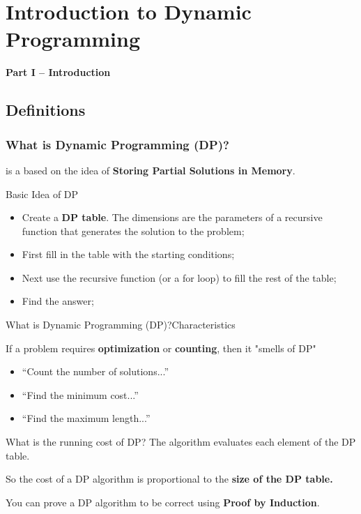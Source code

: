 \section{Introduction to Dynamic Programming}

\begin{frame}
  \begin{center}
    {\bf Part I -- Introduction}
  \end{center}
\end{frame}

\subsection{Definitions}
\begin{frame}
  \frametitle{What is Dynamic Programming (DP)?}

   is a  based on the idea of {\bf Storing Partial Solutions in Memory}.

  \bigskip

  \begin{block}{Basic Idea of DP}
    \begin{itemize}
      \item Create a {\bf DP table}. The dimensions are the parameters of a recursive function that generates the solution to the problem; \bigskip

      \item First fill in the table with the starting conditions;\bigskip

      \item Next use the recursive function (or a for loop) to fill the rest of the table;\bigskip

      \item Find the answer;
    \end{itemize}
  \end{block}
\end{frame}

\begin{frame}{What is Dynamic Programming (DP)?}{Characteristics}

  \begin{block}{If a problem requires {\bf optimization} or {\bf counting}, then it "smells of DP"}

    \begin{itemize}
    \item ``Count the number of solutions...''
    \item ``Find the minimum cost...''
    \item ``Find the maximum length...''
    \end{itemize}
  \end{block}

  \begin{exampleblock}{What is the running cost of DP?}
    The algorithm evaluates each element of the DP table.\medskip

    So the cost of a DP algorithm is proportional to the {\bf size of the DP table.}
  \end{exampleblock}

  You can prove a DP algorithm to be correct using {\bf Proof by Induction}.
\end{frame}

